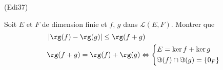 \begin{tiny}(Edi37)\end{tiny} Soit $E$ et $F$ de dimension finie et $f$, $g$ dans $\mathcal{L}(E,F)$. Montrer que
\begin{align*}
  &\left| \rg(f) - \rg(g) \right| \leq \rg(f+g) \\
  &\rg(f+g) = \rg(f) + \rg(g)
  \Leftrightarrow
  \left\lbrace 
  \begin{aligned}
    &E = \ker f + \ker g \\ &\Im(f) \cap \Im(g) = \left\lbrace 0_F\right\rbrace 
  \end{aligned}
  \right. 
\end{align*}
